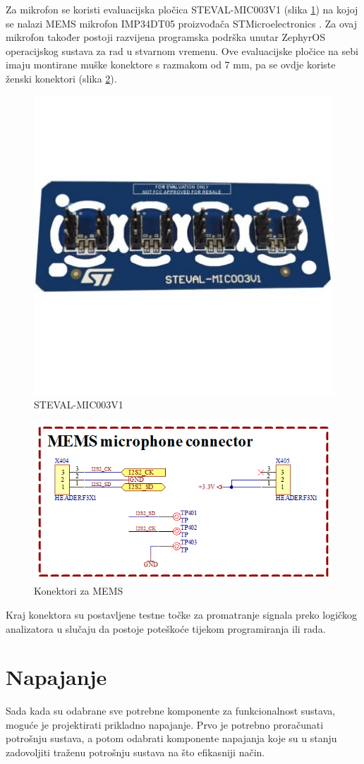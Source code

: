 Za mikrofon se koristi evaluacijska pločica STEVAL-MIC003V1 (slika \ref{slk:STEVAL}) na kojoj se nalazi MEMS mikrofon IMP34DT05 proizvođača STMicroelectronics \cite{stmicroelectronics:steval}. Za ovaj mikrofon također postoji razvijena programska podrška unutar ZephyrOS operacijskog sustava za rad u stvarnom vremenu. Ove evaluacijske pločice na sebi imaju montirane muške konektore s razmakom od 7 mm, pa se ovdje koriste ženski konektori (slika \ref{slk:MEMS}).
\begin{figure}[h!bt]
    \centering
    \includegraphics[width=6 cm]{Figures/STEVAL.jpg}
    \caption{STEVAL-MIC003V1}
    \label{slk:STEVAL}
\end{figure}
\begin{figure}[h!bt]
    \centering
    \includegraphics[width=6 cm]{Figures/MEMS.png}
    \caption{Konektori za MEMS}
    \label{slk:MEMS}
\end{figure}
Kraj konektora su postavljene testne točke za promatranje signala preko logičkog analizatora u slučaju da postoje poteškoće tijekom programiranja ili rada.

\section{Napajanje}
Sada kada su odabrane sve potrebne komponente za funkcionalnost sustava, moguće je projektirati prikladno napajanje. Prvo je potrebno proračunati potrošnju sustava, a potom odabrati komponente napajanja koje su u stanju zadovoljiti traženu potrošnju sustava na što efikasniji način.


